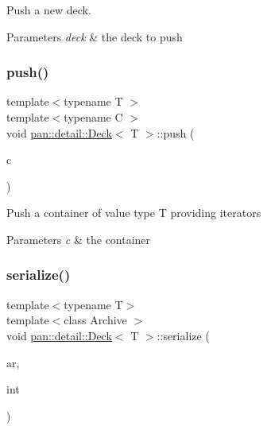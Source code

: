 Push a new deck. 
\begin{DoxyParams}{Parameters}
{\em deck} & the deck to push \\
\hline
\end{DoxyParams}
\mbox{\label{classpan_1_1detail_1_1_deck_aa0bb14b1318470b4c84d02a8f531242d}} 
\subsubsection{\texorpdfstring{push()}{push()}\hspace{0.1cm}{\footnotesize\ttfamily [3/3]}}
{\footnotesize\ttfamily template$<$typename T $>$ \\
template$<$typename C $>$ \\
void \hyperlink{classpan_1_1detail_1_1_deck}{pan\+::detail\+::\+Deck}$<$ T $>$\+::push (\begin{DoxyParamCaption}\item[{const C \&}]{c }\end{DoxyParamCaption})}

Push a container of value type T providing iterators 
\begin{DoxyParams}{Parameters}
{\em c} & the container \\
\hline
\end{DoxyParams}
\mbox{\label{classpan_1_1detail_1_1_deck_a92252be8ce9a2f0ec7604c6471c1bf81}} 
\subsubsection{\texorpdfstring{serialize()}{serialize()}}
{\footnotesize\ttfamily template$<$typename T$>$ \\
template$<$class Archive $>$ \\
void \hyperlink{classpan_1_1detail_1_1_deck}{pan\+::detail\+::\+Deck}$<$ T $>$\+::serialize (\begin{DoxyParamCaption}\item[{Archive \&}]{ar,  }\item[{const unsigned}]{int }\end{DoxyParamCaption})\hspace{0.3cm}{\ttfamily [inline]}}

